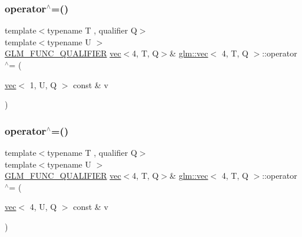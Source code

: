 \mbox{\label{structglm_1_1vec_3_014_00_01_t_00_01_q_01_4_a926de242b3187323bfc98e42863c23d3}} 
\subsubsection{\texorpdfstring{operator$^\wedge$=()}{operator^=()}\hspace{0.1cm}{\footnotesize\ttfamily [5/6]}}
{\footnotesize\ttfamily template$<$typename T , qualifier Q$>$ \\
template$<$typename U $>$ \\
\hyperlink{setup_8hpp_a33fdea6f91c5f834105f7415e2a64407}{G\+L\+M\+\_\+\+F\+U\+N\+C\+\_\+\+Q\+U\+A\+L\+I\+F\+I\+ER} \hyperlink{structglm_1_1vec}{vec}$<$4, T, Q$>$\& \hyperlink{structglm_1_1vec}{glm\+::vec}$<$ 4, T, Q $>$\+::operator$^\wedge$= (\begin{DoxyParamCaption}\item[{\hyperlink{structglm_1_1vec}{vec}$<$ 1, U, Q $>$ const \&}]{v }\end{DoxyParamCaption})}

\mbox{\label{structglm_1_1vec_3_014_00_01_t_00_01_q_01_4_adfc4f1060841f2652c19c17d9980019a}} 
\subsubsection{\texorpdfstring{operator$^\wedge$=()}{operator^=()}\hspace{0.1cm}{\footnotesize\ttfamily [6/6]}}
{\footnotesize\ttfamily template$<$typename T , qualifier Q$>$ \\
template$<$typename U $>$ \\
\hyperlink{setup_8hpp_a33fdea6f91c5f834105f7415e2a64407}{G\+L\+M\+\_\+\+F\+U\+N\+C\+\_\+\+Q\+U\+A\+L\+I\+F\+I\+ER} \hyperlink{structglm_1_1vec}{vec}$<$4, T, Q$>$\& \hyperlink{structglm_1_1vec}{glm\+::vec}$<$ 4, T, Q $>$\+::operator$^\wedge$= (\begin{DoxyParamCaption}\item[{\hyperlink{structglm_1_1vec}{vec}$<$ 4, U, Q $>$ const \&}]{v }\end{DoxyParamCaption})}

